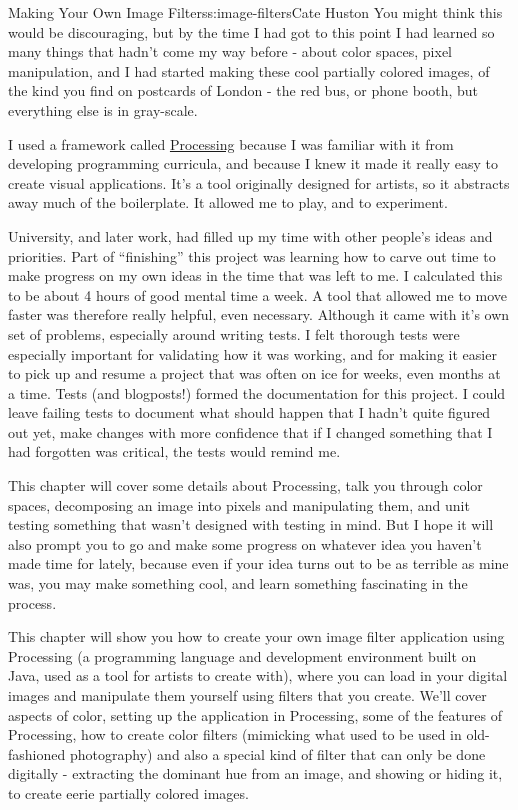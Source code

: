 \begin{aosachapter}{Making Your Own Image Filters}{s:image-filters}{Cate Huston}
You might think this would be discouraging, but by the time I had got to
this point I had learned so many things that hadn't come my way before -
about color spaces, pixel manipulation, and I had started making these
cool partially colored images, of the kind you find on postcards of
London - the red bus, or phone booth, but everything else is in
gray-scale.

I used a framework called \href{https://processing.org/}{Processing}
because I was familiar with it from developing programming curricula,
and because I knew it made it really easy to create visual applications.
It's a tool originally designed for artists, so it abstracts away much
of the boilerplate. It allowed me to play, and to experiment.

University, and later work, had filled up my time with other people's
ideas and priorities. Part of ``finishing'' this project was learning
how to carve out time to make progress on my own ideas in the time that
was left to me. I calculated this to be about 4 hours of good mental
time a week. A tool that allowed me to move faster was therefore really
helpful, even necessary. Although it came with it's own set of problems,
especially around writing tests. I felt thorough tests were especially
important for validating how it was working, and for making it easier to
pick up and resume a project that was often on ice for weeks, even
months at a time. Tests (and blogposts!) formed the documentation for
this project. I could leave failing tests to document what should happen
that I hadn't quite figured out yet, make changes with more confidence
that if I changed something that I had forgotten was critical, the tests
would remind me.

This chapter will cover some details about Processing, talk you through
color spaces, decomposing an image into pixels and manipulating them,
and unit testing something that wasn't designed with testing in mind.
But I hope it will also prompt you to go and make some progress on
whatever idea you haven't made time for lately, because even if your
idea turns out to be as terrible as mine was, you may make something
cool, and learn something fascinating in the process.

\label{the-app}

This chapter will show you how to create your own image filter
application using Processing (a programming language and development
environment built on Java, used as a tool for artists to create with),
where you can load in your digital images and manipulate them yourself
using filters that you create. We'll cover aspects of color, setting up
the application in Processing, some of the features of Processing, how
to create color filters (mimicking what used to be used in old-fashioned
photography) and also a special kind of filter that can only be done
digitally - extracting the dominant hue from an image, and showing or
hiding it, to create eerie partially colored images.


\end{aosachapter}
